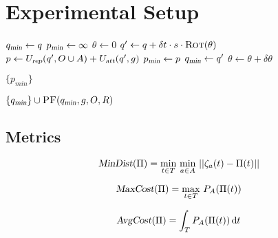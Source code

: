 
\chapter{Experimental Setup}

\label{chapter:experimentalsetup}

\begin{algorithm}[ht]

    \caption{$\Function{PF}(q, g, O, A, R)$}

    \label{algo:pf}
    \begin{algorithmic}[1]
        \setcounter{ALC@line}{0}
        \vspace*{1mm}

        \STATE $q_{\Var{min}} \leftarrow q$
        \STATE $p_{\Var{min}} \leftarrow \infty$
        \STATE $\theta \leftarrow 0$
        \WHILE {$\theta \leq 2\pi$}
            \STATE $q' \leftarrow q + \delta t \cdot s \cdot \Function{Rot}(\theta)$
            \STATE $p \leftarrow U_{\Var{rep}}(q', O \cup A) + U_{\Var{att}}(q', g)$
                \STATE $p_{\Var{min}} \leftarrow p$
                \STATE $q_{\Var{min}} \leftarrow q'$
            \ENDIF
            \STATE $\theta \leftarrow \theta + \delta \theta$
        \ENDWHILE

            \RETURN $\{p_{min}\}$
        \ENDIF

        \RETURN $\{q_{\Var{min}}\} \cup \Function{PF}(q_{\Var{min}}, g, O, R)$
    \end{algorithmic}
\end{algorithm}

\section{Metrics}

\begin{equation}
    \Var{MinDist}(\Pi) = \min_{t \in T} \, \min_{a \in A} \, ||\zeta_a(t) - \Pi(t)||
    \label{eq:md_metric}
\end{equation}

\begin{equation}
    \Var{MaxCost}(\Pi) = \max_{t \in T} \, P_A(\Pi(t))
    \label{eq:cost_metric}
\end{equation}

\begin{equation}
    \Var{AvgCost}(\Pi) = \int_{T} P_A(\Pi(t)) \, \mathrm{d}t
    \label{eq:avg_cost_metric}
\end{equation}
